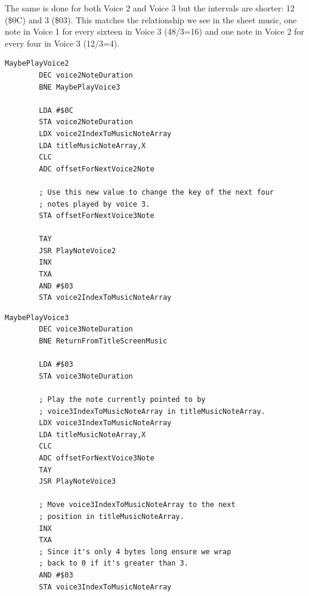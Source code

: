 The same is done for both Voice 2 and Voice 3 but the intervals are shorter: 12 (\$0C) and 3 (\$03). This matches
the relationship we see in the sheet music, one note in Voice 1 for every sixteen in Voice 3 (48/3=16) and one note in
Voice 2 for every four in Voice 3 (12/3=4).

\begin{lstlisting}[caption=\icode{MaybePlayVoice2}\, part of \icode{PlayTitleScreenMusic}.]
MaybePlayVoice2   
        DEC voice2NoteDuration
        BNE MaybePlayVoice3

        LDA #$0C
        STA voice2NoteDuration
        LDX voice2IndexToMusicNoteArray
        LDA titleMusicNoteArray,X
        CLC
        ADC offsetForNextVoice2Note

        ; Use this new value to change the key of the next four
        ; notes played by voice 3. 
        STA offsetForNextVoice3Note

        TAY
        JSR PlayNoteVoice2
        INX
        TXA
        AND #$03
        STA voice2IndexToMusicNoteArray
\end{lstlisting}

\begin{lstlisting}[caption= \icode{MaybePlayVoice3}\, part of \icode{PlayTitleScreenMusic}.]
MaybePlayVoice3   
        DEC voice3NoteDuration
        BNE ReturnFromTitleScreenMusic

        LDA #$03
        STA voice3NoteDuration

        ; Play the note currently pointed to by 
        ; voice3IndexToMusicNoteArray in titleMusicNoteArray.
        LDX voice3IndexToMusicNoteArray
        LDA titleMusicNoteArray,X
        CLC
        ADC offsetForNextVoice3Note
        TAY
        JSR PlayNoteVoice3

        ; Move voice3IndexToMusicNoteArray to the next
        ; position in titleMusicNoteArray.
        INX
        TXA
        ; Since it's only 4 bytes long ensure we wrap
        ; back to 0 if it's greater than 3.
        AND #$03
        STA voice3IndexToMusicNoteArray
\end{lstlisting}

